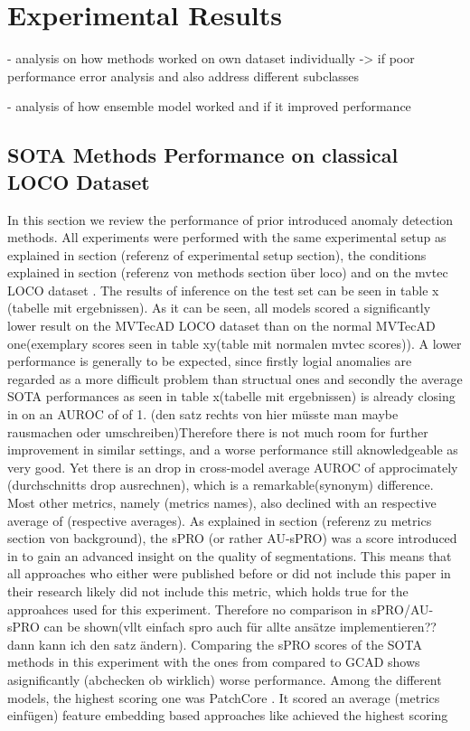 \chapter{Experimental Results}
\label{chap:results}



- analysis on how methods worked on own dataset individually
-> if poor performance error analysis and also address different subclasses

- analysis of how ensemble model worked and if it improved performance



\section{SOTA Methods Performance on classical LOCO Dataset}
\label{sec:locoresultssota}
In this section we review the performance of prior introduced anomaly detection methods. All experiments were performed with the same 
experimental setup as explained in section (referenz of experimental setup section), the conditions explained in section (referenz von methods section über loco) 
and on the mvtec LOCO dataset \cite{LOCODentsAndScratchesBergmann2022}. 
The results of inference on the test set can be seen in table x (tabelle mit ergebnissen). As it can be seen, all models scored a significantly 
lower result on the MVTecAD LOCO dataset than on the normal MVTecAD one(exemplary scores seen in table xy(table mit normalen mvtec scores)). 
A lower performance is generally to be expected, since firstly logial anomalies are regarded as a more difficult problem than structual 
ones and secondly the average SOTA performances as seen in table x(tabelle mit ergebnissen) is already closing in on an AUROC of of 1. 
(den satz rechts von hier müsste man maybe rausmachen oder umschreiben)Therefore there is not much room for further improvement in similar settings, and a worse performance still aknowledgeable as very good. 
Yet there is an drop in cross-model average AUROC of approcimately (durchschnitts drop ausrechnen), which is a remarkable(synonym) difference. 
Most other metrics, namely (metrics names), also declined with an respective average of (respective averages). As explained in section 
(referenz zu metrics section von background), the sPRO (or rather AU-sPRO) was a score introduced in \cite{LOCODentsAndScratchesBergmann2022} to gain an 
advanced insight on the quality of segmentations. This means that all approaches who either were published before or did not include this 
paper in their research likely did not include this metric, which holds true for the approahces used for this experiment. Therefore no comparison 
in sPRO/AU-sPRO can be shown(vllt einfach spro auch für allte ansätze implementieren?? dann kann ich den satz ändern). Comparing the sPRO 
scores of the SOTA methods in this experiment with the ones from compared to GCAD \cite{LOCODentsAndScratchesBergmann2022} shows asignificantly 
(abchecken ob wirklich) worse performance.
Among the different models, the highest scoring one was PatchCore \cite{patchCore2022}. It scored an average (metrics einfügen) feature embedding based approaches like  
achieved the highest scoring


